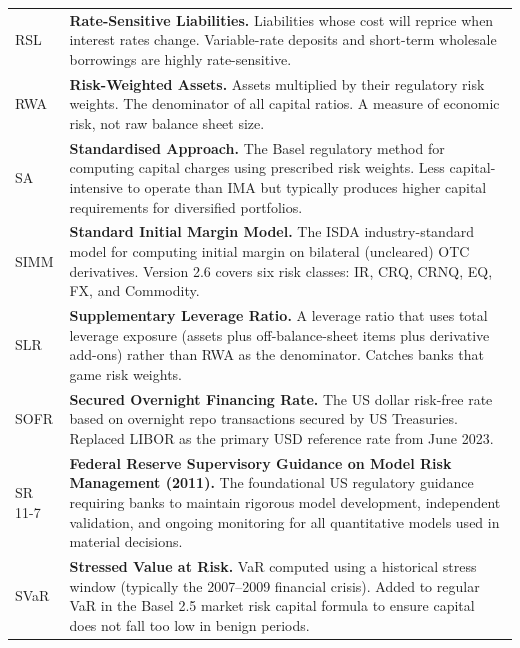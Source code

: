 \documentclass[12pt,a4paper]{article}
\begin{document}
\begin{longtable}{p{3.2cm} p{10.8cm}}
  RSL   & \textbf{Rate-Sensitive Liabilities.}
          Liabilities whose cost will reprice when interest rates change.
          Variable-rate deposits and short-term wholesale borrowings are
          highly rate-sensitive. \\[4pt]

  RWA   & \textbf{Risk-Weighted Assets.}
          Assets multiplied by their regulatory risk weights.  The denominator
          of all capital ratios.  A measure of economic risk, not raw balance
          sheet size. \\[4pt]

  SA    & \textbf{Standardised Approach.}
          The Basel regulatory method for computing capital charges using
          prescribed risk weights.  Less capital-intensive to operate than IMA
          but typically produces higher capital requirements for diversified
          portfolios. \\[4pt]

  SIMM  & \textbf{Standard Initial Margin Model.}
          The ISDA industry-standard model for computing initial margin on
          bilateral (uncleared) OTC derivatives.  Version 2.6 covers six
          risk classes: IR, CRQ, CRNQ, EQ, FX, and Commodity. \\[4pt]

  SLR   & \textbf{Supplementary Leverage Ratio.}
          A leverage ratio that uses total leverage exposure (assets plus
          off-balance-sheet items plus derivative add-ons) rather than
          RWA as the denominator.  Catches banks that game risk weights. \\[4pt]

  SOFR  & \textbf{Secured Overnight Financing Rate.}
          The US dollar risk-free rate based on overnight repo transactions
          secured by US Treasuries.  Replaced LIBOR as the primary USD
          reference rate from June 2023. \\[4pt]

  SR 11-7 & \textbf{Federal Reserve Supervisory Guidance on Model Risk Management (2011).}
            The foundational US regulatory guidance requiring banks to maintain
            rigorous model development, independent validation, and ongoing
            monitoring for all quantitative models used in material decisions. \\[4pt]

  SVaR  & \textbf{Stressed Value at Risk.}
          VaR computed using a historical stress window (typically the 2007--2009
          financial crisis).  Added to regular VaR in the Basel 2.5 market risk
          capital formula to ensure capital does not fall too low in benign
          periods. \\[4pt]


\end{longtable}
\end{document}
